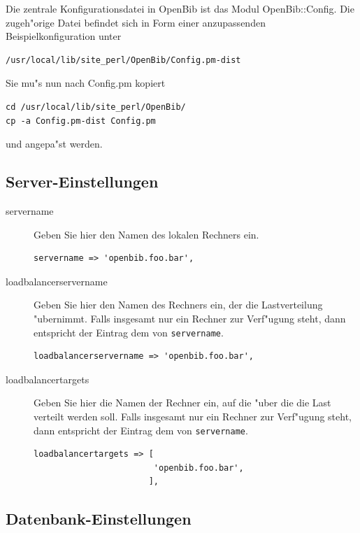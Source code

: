 \documentclass[11pt, twoside, a4paper, BCOR8mm, DIV12, bibtotoc,idxtotoc]{scrbook}
\begin{document}
Die zentrale Konfigurationsdatei in OpenBib ist das Modul
OpenBib::Config. Die zugeh"orige Datei befindet sich in Form einer
anzupassenden Beispielkonfiguration unter 

\begin{verbatim}
/usr/local/lib/site_perl/OpenBib/Config.pm-dist
\end{verbatim}

Sie mu"s nun nach Config.pm kopiert 

\begin{verbatim}
cd /usr/local/lib/site_perl/OpenBib/
cp -a Config.pm-dist Config.pm
\end{verbatim}

und angepa"st werden.


\subsection{Server-Einstellungen}

\begin{description}
\item[servername] Geben Sie hier den Namen des lokalen Rechners
  ein. 
\begin{verbatim}
servername => 'openbib.foo.bar',
\end{verbatim}

\item[loadbalancerservername] Geben Sie hier den Namen des Rechners
  ein, der die Lastverteilung "ubernimmt. Falls insgesamt nur ein
  Rechner zur Verf"ugung steht, dann entspricht der Eintrag dem von
  \texttt{servername}.
\begin{verbatim}
loadbalancerservername => 'openbib.foo.bar',
\end{verbatim}

\item[loadbalancertargets] Geben Sie hier die Namen der Rechner ein,
  auf die "uber die die Last verteilt werden soll. Falls insgesamt nur
  ein Rechner zur Verf"ugung steht, dann entspricht der Eintrag dem
  von \texttt{servername}.
\begin{verbatim}
loadbalancertargets => [
                        'openbib.foo.bar',
                       ],
\end{verbatim}
\end{description}


\subsection{Datenbank-Einstellungen}
\end{document}
